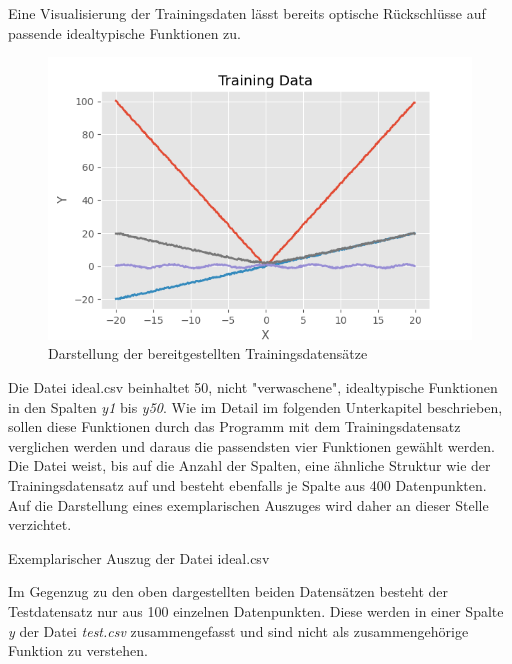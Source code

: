 Eine Visualisierung der Trainingsdaten lässt bereits optische Rückschlüsse auf passende idealtypische Funktionen zu.
\begin{figure}[h]
\centering
\includegraphics[width=12cm]{../output/figures/train.png}
\caption{Darstellung der bereitgestellten Trainingsdatensätze \cite{Gage:18}}\label{fig:train}
\end{figure}

Die Datei ideal.csv beinhaltet 50, nicht "verwaschene", idealtypische Funktionen in den Spalten \emph{y1} bis \emph{y50}. Wie im Detail im folgenden Unterkapitel beschrieben, sollen diese Funktionen durch das Programm mit dem Trainingsdatensatz verglichen werden und daraus die passendsten vier Funktionen gewählt werden. Die Datei weist, bis auf die Anzahl der Spalten, eine ähnliche Struktur wie der Trainingsdatensatz auf und besteht ebenfalls je Spalte aus 400 Datenpunkten. Auf die Darstellung eines exemplarischen Auszuges wird daher an dieser Stelle verzichtet.

\begin{table}[H]
\small
\centering
{}
\caption{Exemplarischer Auszug der Datei ideal.csv}
\label{tab:Exemplarischer Auszug aus ideal.csv}
\end{table} 

Im Gegenzug zu den oben dargestellten beiden Datensätzen besteht der Testdatensatz nur aus 100 einzelnen Datenpunkten. Diese werden in einer Spalte \emph{y} der Datei \emph{test.csv} zusammengefasst und sind nicht als zusammengehörige Funktion zu verstehen. 

